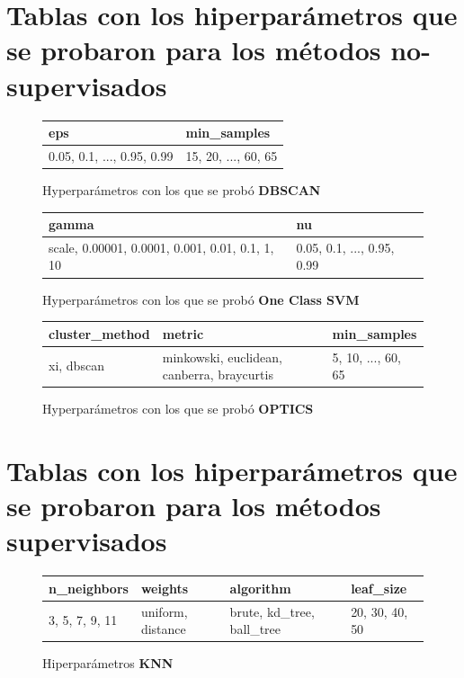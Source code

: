 \begin{appendices}
	\section*{Tablas con los hiperparámetros que se probaron para los métodos no-supervisados}
		\begin{figure}[htb]
			\centering
			\begin{tabular}{ll}
				\toprule
				                                          eps &                                  min\_samples \\
				\midrule
				  0.05, 0.1, ..., 0.95, 0.99 &  15, 20, ..., 60, 65 \\
				\bottomrule
			\end{tabular}
			\caption{Hyperparámetros con los que se probó \textbf{DBSCAN}}
			\label{table:4}
		\end{figure}
		
		\begin{figure}[htb]
			\centering
			\begin{tabular}{ll}
				\toprule
				                                            gamma &                                                 nu \\
				\midrule
				  scale, 0.00001, 0.0001, 0.001, 0.01, 0.1, 1, 10 &  0.05, 0.1, ..., 0.95, 0.99 \\
				\bottomrule
			\end{tabular}
			\caption{Hyperparámetros con los que se probó \textbf{One Class SVM}}
			\label{table:5}
		\end{figure}
		
		\begin{figure}[htb]
			\centering
			\begin{tabular}{lll}
				\toprule
				 cluster\_method &                                      metric &                                        min\_samples \\
				\midrule
				     xi, dbscan &  minkowski, euclidean, canberra, braycurtis &  5, 10, ..., 60, 65 \\
				\bottomrule
			\end{tabular}
			\caption{Hyperparámetros con los que se probó \textbf{OPTICS}}
			\label{table:6}
		\end{figure}

	\section*{Tablas con los hiperparámetros que se probaron para los métodos supervisados}
		\begin{figure}[ht!]
			\centering
			\begin{tabular}{llll}
				\toprule
					   n\_neighbors &            weights &                  algorithm &       leaf\_size \\
				\midrule
				 3, 5, 7, 9, 11 &  uniform, distance &  brute, kd\_tree, ball\_tree &  20, 30, 40, 50 \\
				\bottomrule
			\end{tabular}
			\caption{Hiperparámetros \textbf{KNN}}
			\label{table:7}
		\end{figure}


\end{appendices}
